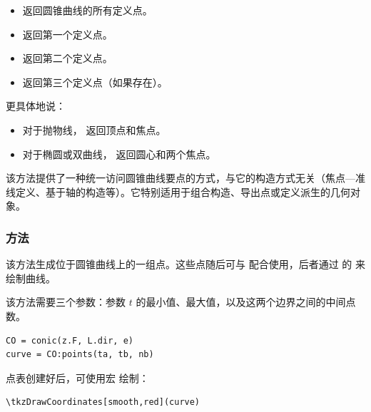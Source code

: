   \begin{itemize}
    \item {} 返回圆锥曲线的所有定义点。
    \item {} 返回第一个定义点。
    \item {} 返回第二个定义点。
    \item {} 返回第三个定义点（如果存在）。
  \end{itemize}

  \medskip

  更具体地说：
  \begin{itemize}
    \item 对于抛物线， 返回顶点和焦点。
    \item 对于椭圆或双曲线， 返回圆心和两个焦点。
  \end{itemize}

  该方法提供了一种统一访问圆锥曲线要点的方式，与它的构造方式无关（焦点—准线定义、基于轴的构造等）。它特别适用于组合构造、导出点或定义派生的几何对象。


\subsubsection{方法 }
\label{ssub:method_conic_points}

该方法生成位于圆锥曲线上的一组点。这些点随后可与  配合使用，后者通过 \TIKZ{} 的  来绘制曲线。

该方法需要三个参数：参数 $t$ 的最小值、最大值，以及这两个边界之间的中间点数。

\begin{mybox}
  \begin{verbatim}
CO = conic(z.F, L.dir, e)
curve = CO:points(ta, tb, nb)
  \end{verbatim}
\end{mybox}

点表创建好后，可使用宏  绘制：

\begin{mybox}
  \begin{verbatim}
\tkzDrawCoordinates[smooth,red](curve)
  \end{verbatim}
\end{mybox}

